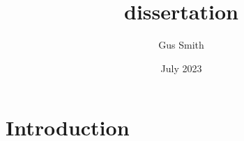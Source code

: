 \documentclass{article}
\title{dissertation}
\author{Gus Smith}
\date{July 2023}
\begin{document}
\maketitle

\section{Introduction}
\end{document}

